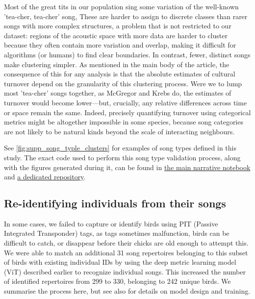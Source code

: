 \documentclass[9pt, onecolumn, twoside, lineno]{gsajnl}
\begin{document}
Most of the great tits in our population sing some variation of the well-known 'tea-cher, tea-cher' song, These are harder to assign to discrete classes than rarer songs with more complex structures, a problem that is not restricted to our dataset: regions of the acoustic space with more data are harder to cluster because they often contain more variation and overlap, making it difficult for algorithms (or humans) to find clear boundaries. In contrast, fewer, distinct songs make clustering simpler. As mentioned in the main body of the article, the consequence of this for any analysis is that the absolute estimates of cultural turnover depend on the granularity of this clustering process. Were we to lump most 'tea-cher' songs together, as McGregor and Krebs \autocite{mcgregor1982b} do, the estimates of turnover would become lower---but, crucially, any relative differences across time or space remain the same. Indeed, precisely quantifying turnover using categorical metrics might be altogether impossible in some species, because song categories are not likely to be natural kinds beyond the scale of interacting neighbours. 

See \autoref{fig:supp_song_typle_clusters} for examples of song types defined in this study. The exact code used to perform this song type validation process, along with the figures generated during it, can be found in \href{https://github.com/nilomr/wytham-songtype-validation/blob/main/notebooks/4_train-model.ipynb}{the main narrative notebook} and \href{https://github.com/nilomr/wytham-songtype-validation}{a dedicated repository}.

\subsection{Re-identifying individuals from their songs}

In some cases, we failed to capture or identify birds using PIT (Passive Integrated Transponder) tags, as tags sometimes malfunction, birds can be difficult to catch, or disappear before their chicks are old enough to attempt this.  We were able to match an additional 31 song repertoires belonging to this subset of birds with existing individual IDs by using the deep metric learning model (ViT) described earlier to recognize individual songs. This increased the number of identified repertoires from 299 to 330, belonging to 242 unique birds. We summarise the process here, but see also \autocite{merinorecalde2023a} for details on model design and training.
\end{document}
